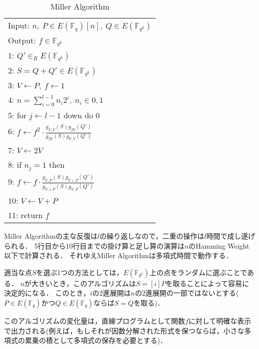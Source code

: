 \par
\begin{table}[htbp]
 \begin{center}
  \begin{tabular}{|l|}
     \hline
     Input: $n, \ P \in E(\mathbb{F}_q)[n], \ Q \in E(\mathbb{F}_{q^k})$ \\
     Output: $f \in \mathbb{F}_{q^k}$  \\
     \hline
     1: \quad $Q' \in _R E(\mathbb{F}_{q^k})$\\
     2: \quad $S=Q+Q' \in E(\mathbb{F}_{q^k})$\\
     3: \quad $V \gets P, \ f \gets 1$\\
     4: \quad $n=\sum^{l-1}_{i=0} n_i 2^i, \ n_i \in {0,1}$\\
     5: \quad for $j \gets l-1$ down do 0\\
     6: \quad \quad $f \gets f^2 \cdot \frac{g_{V,V}(S)g_{2V}(Q')}{g_{2V}(S)g_{V,V}(Q')}$\\
     7: \quad \quad $V \gets 2V$\\
     8: \quad if $n_j = 1$ then\\
     9: \quad \quad $f \gets f \cdot \frac{g_{V,P}(S)g_{V+P}(Q')}{g_{V+P}(S)g_{V,P}(Q')}$\\
     10: \quad \quad $V \gets V+P$\\
     11: \quad return $f$\\
     \hline
   \end{tabular}
 \end{center}
 \caption{Miller Algorithm}
\end{table}
\par
Miller Algorithmの主な反復は$l$の繰り返しなので，二重の操作は$l$時間で成し遂げられる．
5行目から10行目までの掛け算と足し算の演算は$n$のHamming Weight以下で計算される．
それゆえMiller Algorithmは多項式時間で動作する．
\par
適当な点$S$を選ぶ1つの方法としては，$E(\mathbb{F}_{q^k})$上の点をランダムに選ぶことである．
$n$が大きいとき，このアルゴリズムは$S = [i]P$を取ることによって容易に決定的になる．
このとき，$i$の2進展開は$n$の2進展開の一部ではないとする($P \in E(\mathbb{F} _q)$かつ$Q \in E(\mathbb{F} _q)$ならば$S = Q$を取る)．
\par
このアルゴリズムの変化量は，直線プログラムとして関数$f$に対して明確な表示で出力される(例えば，もしそれが因数分解された形式を保つならば，小さな多項式の累乗の積として多項式の保存を必要とする)．\\

\par
